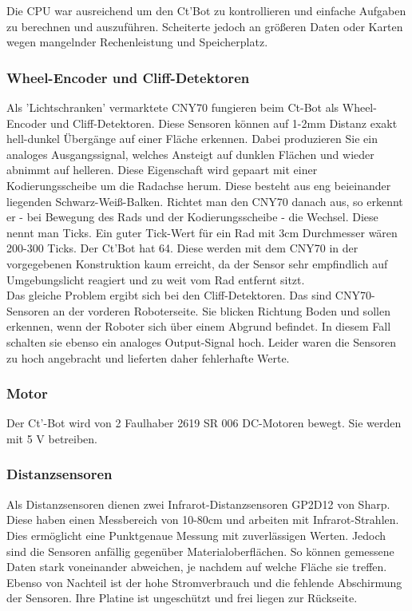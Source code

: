 \documentclass[a4paper,cleardoubleempty,BCOR1cm]{book}
\begin{document}
Die CPU war ausreichend um den Ct'Bot zu kontrollieren und einfache Aufgaben zu berechnen und auszuführen. Scheiterte jedoch an größeren Daten oder Karten wegen mangelnder Rechenleistung und Speicherplatz. 

\subsubsection{Wheel-Encoder und Cliff-Detektoren}
Als 'Lichtschranken' vermarktete CNY70 fungieren beim Ct-Bot als Wheel-Encoder und Cliff-Detektoren. Diese Sensoren können auf 1-2mm Distanz exakt hell-dunkel Übergänge auf einer Fläche erkennen. Dabei produzieren Sie ein analoges Ausgangssignal, welches Ansteigt auf dunklen Flächen und wieder abnimmt auf helleren. Diese Eigenschaft wird gepaart mit einer Kodierungsscheibe um die Radachse herum. Diese besteht aus eng beieinander liegenden Schwarz-Weiß-Balken. Richtet man den CNY70 danach aus, so erkennt er - bei Bewegung des Rads und der Kodierungsscheibe - die Wechsel. Diese nennt man Ticks. Ein guter Tick-Wert für ein Rad mit 3cm Durchmesser wären 200-300 Ticks. Der Ct'Bot hat 64. Diese werden mit dem CNY70 in der vorgegebenen Konstruktion kaum erreicht, da der Sensor sehr empfindlich auf Umgebungslicht reagiert und zu weit vom Rad entfernt sitzt. \\
Das gleiche Problem ergibt sich bei den Cliff-Detektoren. Das sind CNY70-Sensoren an der vorderen Roboterseite. Sie blicken Richtung Boden und sollen erkennen, wenn der Roboter sich über einem Abgrund befindet. In diesem Fall schalten sie ebenso ein analoges Output-Signal hoch. Leider waren die Sensoren zu hoch angebracht und lieferten daher fehlerhafte Werte. 

\subsubsection{Motor}
Der Ct'-Bot wird von 2 Faulhaber 2619 SR 006 DC-Motoren bewegt. Sie werden mit 5 V betreiben. 

\subsubsection{Distanzsensoren}
Als Distanzsensoren dienen zwei Infrarot-Distanzsensoren GP2D12 von Sharp. Diese haben einen Messbereich von 10-80cm und arbeiten mit Infrarot-Strahlen. Dies ermöglicht eine Punktgenaue Messung mit zuverlässigen Werten. Jedoch sind die Sensoren anfällig gegenüber Materialoberflächen. So können gemessene Daten stark voneinander abweichen, je nachdem auf welche Fläche sie treffen. Ebenso von Nachteil ist der hohe Stromverbrauch und die fehlende Abschirmung der Sensoren. Ihre Platine ist ungeschützt und frei liegen zur Rückseite. 
\end{document}
